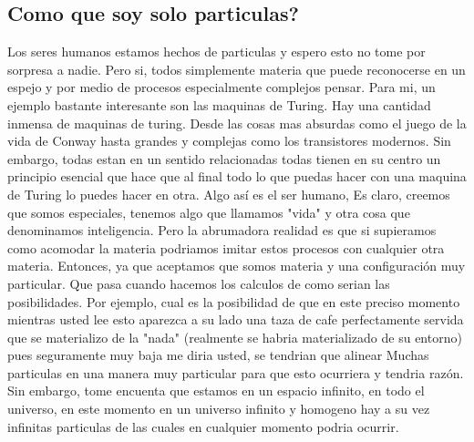 \documentclass[12pt]{exam}
\begin{document}
\begin{multicols}{2}
\subsection*{Como que soy solo particulas?}
Los seres humanos estamos hechos de particulas y espero esto no tome por sorpresa a nadie. Pero si, todos simplemente materia
que puede reconocerse en un espejo y por medio de procesos especialmente complejos pensar. Para mi, un ejemplo bastante interesante
son las maquinas de Turing. Hay una cantidad inmensa de maquinas de turing. Desde las cosas mas absurdas como el juego
de la vida de Conway hasta grandes y complejas como los transistores modernos. Sin embargo, todas estan en un sentido relacionadas
todas tienen en su centro un principio esencial que hace que al final todo lo que puedas hacer con una maquina de Turing lo puedes 
hacer en otra. Algo así es el ser humano, Es claro, creemos que somos especiales, tenemos algo que llamamos "vida" y otra cosa que 
denominamos inteligencia. Pero la abrumadora realidad es que si supieramos como acomodar la materia podriamos imitar estos procesos
con cualquier otra materia. Entonces, ya que aceptamos que somos materia y una configuración muy particular. Que pasa cuando hacemos
los calculos de como serian las posibilidades. Por ejemplo, cual es la posibilidad de que en este preciso momento mientras usted
lee esto aparezca a su lado una taza de cafe perfectamente servida que se materializo de la "nada" (realmente se habria materializado
de su entorno) pues seguramente muy baja me diria usted, se tendrian que alinear Muchas particulas en una manera muy particular
para que esto ocurriera y tendria razón. Sin embargo, tome encuenta que estamos en un espacio infinito, en todo el universo, en este momento
en un universo infinito y homogeno hay a su vez infinitas particulas de las cuales en cualquier momento podria ocurrir.


\end{multicols}
\end{document}
